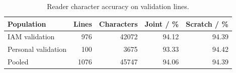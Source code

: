 \begin{table}[!htbp]\centering\small
\begin{tabular}{lrrrr}\toprule
Population & Lines & Characters & Joint / \% & Scratch / \%\\\midrule
IAM validation & 976 & 42072 & 94.12 & 94.39\\
Personal validation & 100 & 3675 & 93.33 & 94.42\\
Pooled & 1076 & 45747 & 94.06 & 94.39\\\bottomrule
\end{tabular}
\caption{Reader character accuracy on validation lines.}\label{tab:res-r2-reader}
\end{table}
